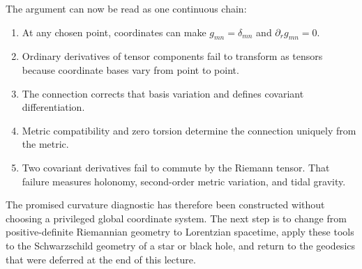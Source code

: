 The argument can now be read as one continuous chain:
\begin{enumerate}
 \item At any chosen point, coordinates can make
 \(g_{mn}=\delta_{mn}\) and \(\partial_rg_{mn}=0\).
 \item Ordinary derivatives of tensor components fail to transform as
 tensors because coordinate bases vary from point to point.
 \item The connection corrects that basis variation and defines
 covariant differentiation.
 \item Metric compatibility and zero torsion determine the connection
 uniquely from the metric.
 \item Two covariant derivatives fail to commute by the Riemann tensor.
 That failure measures holonomy, second-order metric variation, and
 tidal gravity.
\end{enumerate}

The promised curvature diagnostic has therefore been constructed
without choosing a privileged global coordinate system. The next step
is to change from positive-definite Riemannian geometry to Lorentzian
spacetime, apply these tools to the Schwarzschild geometry of a star or
black hole, and return to the geodesics that were deferred at the end
of this lecture.
